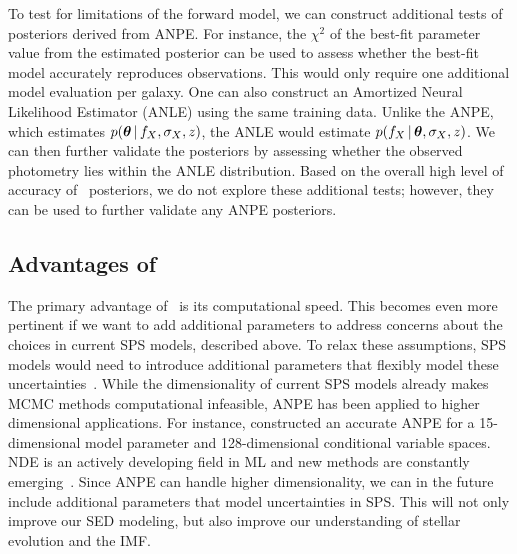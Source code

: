 To test for limitations of the forward model, we can construct additional tests
of posteriors derived from ANPE. 
For instance, the $\chi^2$ of the best-fit parameter value from the 
estimated posterior can be used to assess whether the best-fit model 
accurately reproduces observations.
This would only require one additional model evaluation per galaxy. 
One can also construct an Amortized Neural Likelihood Estimator (ANLE) using
the same training data.
Unlike the ANPE, which estimates $p(\boldsymbol{\theta}\,|\, f_X, \sigma_X, z)$, the ANLE
would estimate $p(f_X \,|\, \boldsymbol{\theta}, \sigma_X, z)$.
We can then further validate the posteriors by assessing whether the observed
photometry lies within the ANLE distribution. 
Based on the overall high level of accuracy of \sedflow~posteriors, we do not
explore these additional tests; however, they can be used to further validate
any ANPE posteriors. 

\subsection{Advantages of \sedflow} 
The primary advantage of \sedflow~is its computational speed. 
This becomes even more pertinent if we want to add additional parameters to
address concerns about the choices in current SPS models, described above.
To relax these assumptions, SPS models would need to introduce additional
parameters that flexibly model these uncertainties~\citep{conroy2009,
conroy2010c}. 
While the dimensionality of current SPS models already makes MCMC methods
computational infeasible, ANPE has been applied to higher dimensional
applications.
For instance, \cite{dax2021} constructed an accurate ANPE for a
15-dimensional model parameter and 128-dimensional conditional variable
spaces.
NDE is an actively developing field in ML and new methods are constantly
emerging~\citep[\eg][]{wu2020, dhariwal2021}. 
Since ANPE can handle higher dimensionality, we can in the future include
additional parameters that model uncertainties in SPS. 
This will not only improve our SED modeling, but also improve our understanding
of stellar evolution and the IMF.

